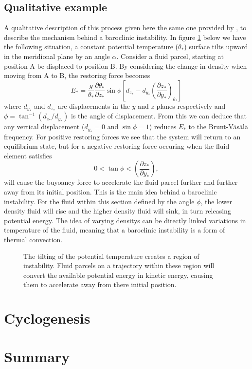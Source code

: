 \documentclass{article}
\begin{document}
\subsection{Qualitative example} 
A qualitative description of this process given here the same one provided by \cite{Pedlosky1979}, to describe the mechanism behind a baroclinic instability.  In figure \ref{pedloskyexample} below we have the following situation, a constant potential temperature ($\theta_*$) surface tilts upward in the meridional plane by an angle $\alpha$. Consider a fluid parcel, starting at position A be displaced to position B. By considering the change in density when moving from A to B, the restoring force becomes  
\begin{equation}
  E_* = \frac{g}{\theta_*}\frac{\partial\theta_*}{\partial z_*}\sin\phi\left[d_{z_*}-d_{y_*}\left(\frac{\partial z_*}{\partial y_*}\right)_{\theta_*}\right]
\end{equation}
where $d_{y_*}$ and $d_{z_*}$ are displacements in the $y$ and $z$ planes respectively and $\phi=\tan^{-1}(d_{z_*}/d_{y_*})$ is the angle of displacement. From this we can deduce that any vertical displacement ($d_{y_*}=0$ and $\sin\phi = 1$) reduces $E_*$ to the Brunt-V\"as\"al\"a frequency. For positive restoring forces we see that the system will return to an equilibrium state, but for a negative restoring force occuring when the fluid element satisfies
\begin{equation}
  0 < \tan\phi < \left(\frac{\partial z_*}{\partial y_*}\right),
\end{equation}
will cause the buyoancy force to accelerate the fluid parcel further and further away from its initial position. This is the main idea behind a baroclinic instability. For the fluid within this section defined by the angle $\phi$, the lower density fluid will rise and the higher density fluid will sink, in turn releasing potential energy. The idea of varying densitys can be directly linked variations in temperature of the fluid, meaning that a baroclinic instability is a form of thermal convection. 
\begin{figure}[b]
  \centering
  
  \caption{The tilting of the potential temperature creates a region of instability. Fluid parcels on a trajectory within these region will convert the available potential energy in kinetic energy, causing them to accelerate away from there initial position. }
  \label{pedloskyexample}
\end{figure}

\section{Cyclogenesis} 



\section{Summary}


\end{document}
